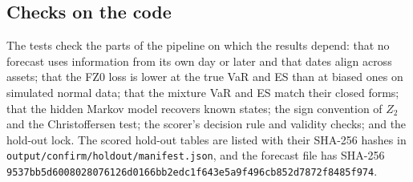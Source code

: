\subsection{Checks on the code}\label{sec:code-tests}

The tests check the parts of the pipeline on which the results depend: that no forecast uses information from its own day or later and that dates align across assets; that the FZ0 loss is lower at the true VaR and ES than at biased ones on simulated normal data; that the mixture VaR and ES match their closed forms; that the hidden Markov model recovers known states; the sign convention of $Z_2$ and the Christoffersen test; the scorer's decision rule and validity checks; and the hold-out lock. The scored hold-out tables are listed with their SHA-256 hashes in \texttt{output/confirm/holdout/manifest.json}, and the forecast file has SHA-256 \texttt{9537bb5d6008028076126d0166bb2edc1f643e5a9f496cb852d7872f8485f974}.
